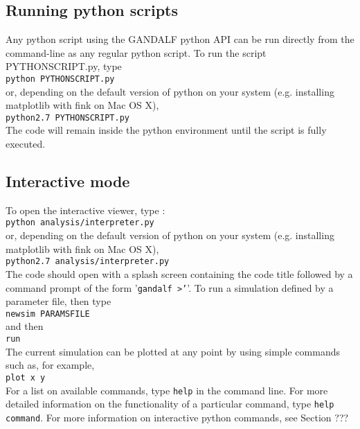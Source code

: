 \documentclass[a4paper]{article}
\newcommand{\var}[1]{\texttt{#1}}
\begin{document}
\subsection{Running python scripts}

\noindent Any python script using the GANDALF python API can be run directly from the command-line as any regular python script.  To run the script PYTHONSCRIPT.py, type \\
\newline
\var{python PYTHONSCRIPT.py} \\
\newline
or, depending on the default version of python on your system (e.g. installing matplotlib with fink on Mac OS X), \\
\newline
\var{python2.7 PYTHONSCRIPT.py} \\
\newline
The code will remain inside the python environment until the script is fully executed.



\subsection{Interactive mode}

\noindent To open the interactive viewer, type : \\
\newline
\var{python analysis/interpreter.py} \\
\newline
or, depending on the default version of python on your system (e.g. installing matplotlib with fink on Mac OS X), \\
\newline
\var{python2.7 analysis/interpreter.py} \\
\newline
\noindent The code should open with a splash screen containing the code title followed by a command prompt of the form '\var{gandalf >'}'.  To run a simulation defined by a parameter file, then type \\
\newline
\var{newsim PARAMSFILE} \\
\newline
\noindent and then \\
\newline
\var{run} \\
\newline
\noindent The current simulation can be plotted at any point by using simple commands such as, for example, \\
\newline
\var{plot x y} \\
\newline
\noindent For a list on available commands, type \var{help} in the command line.  For more detailed information on the functionality of a particular command, type \var{help command}.  For more information on interactive python commands, see Section ???
\end{document}
